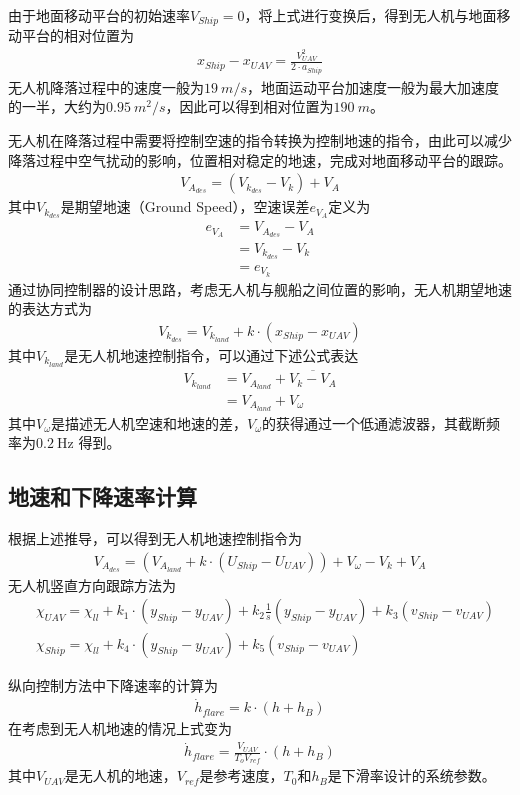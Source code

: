 由于地面移动平台的初始速率$V_{Ship}=0$，将上式进行变换后，得到无人机与地面移动平台的相对位置为
\begin{align}
x_{Ship}-x_{UAV} = \frac{V_{UAV}^2}{2 \cdot a_{Ship}}
\end{align}
无人机降落过程中的速度一般为$19\ m/s$，地面运动平台加速度一般为最大加速度的一半，大约为$0.95\ m^2/s$，因此可以得到相对位置为$190\ m$。

无人机在降落过程中需要将控制空速的指令转换为控制地速的指令，由此可以减少降落过程中空气扰动的影响，位置相对稳定的地速，完成对地面移动平台的跟踪。
\begin{align}
V_{A_{des}} = (V_{k_{des}} -V_k) + V_A
\end{align}
其中$V_{k_{des}}$是期望地速（Ground Speed），空速误差$e_{V_A}$定义为
\begin{align}
e_{V_{A}} &= V_{A_{des}}-V_A \\
&= V_{k_{des}} - V_k \\
&= e_{V_k}
\end{align}
通过协同控制器的设计思路，考虑无人机与舰船之间位置的影响，无人机期望地速的表达方式为
\begin{align}
V_{k_{des}} = V_{k_{land}} + k \cdot (x_{Ship} - x_{UAV})
\end{align}
其中$V_{k_{land}}$是无人机地速控制指令，可以通过下述公式表达
\begin{align}
V_{k_{land}} &= V_{A_{land}} + \overline{V_k - V_A} \\
&= V_{A_{land}} + V_\omega
\end{align}
其中$V_\omega$是描述无人机空速和地速的差，$V_\omega$的获得通过一个低通滤波器，其截断频率为$0.2\ \text{Hz}$ 得到。

\subsection{地速和下降速率计算}
根据上述推导，可以得到无人机地速控制指令为
\begin{align}
V_{A_{des}} =( V_{A_{land}} + k \cdot (U_{Ship} - U_{UAV})) + V_\omega - V_k + V_A
\end{align}
无人机竖直方向跟踪方法为
\begin{align}
&\chi_{UAV} = \chi_{ll} + k_1 \cdot (y_{Ship} - y_{UAV}) +k_2 \frac{1}{s} (y_{Ship} - y_{UAV}) + k_3 (v_{Ship} - v_{UAV}) \\
&\chi_{Ship} = \chi_{ll} + k_4 \cdot (y_{Ship} - y_{UAV}) +  k_5 (v_{Ship} - v_{UAV})
\end{align}

纵向控制方法中下降速率的计算为
\begin{align}
\dot{h}_{flare} = k \cdot (h + h_B)
\end{align}
在考虑到无人机地速的情况上式变为
\begin{align}
\dot{h}_{flare} = \frac{V_{UAV}}{T_o V_{ref}} \cdot (h + h_B)
\end{align}
其中$V_{UAV}$是无人机的地速，$V_{ref}$是参考速度，$T_0$和$h_B$是下滑率设计的系统参数。

